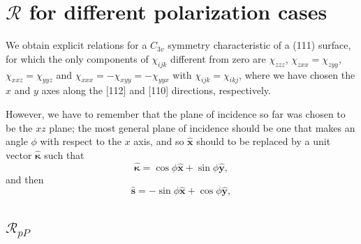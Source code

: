 \documentclass[10pt]{article}
\begin{document}
\section{\texorpdfstring{$\mathcal{R}$}{R} for different polarization cases}

We obtain explicit relations for a $C_{3v}$ symmetry characteristic of a (111)
surface, for which the only components of $\chi_{ijk}$ different from zero are
$\chi_{zzz}$, $\chi_{zxx}=\chi_{zyy}$, $\chi_{xxz}=\chi_{yyz}$ and
$\chi_{xxx}=-\chi_{xyy}=-\chi_{yyx}$ with $\chi_{ijk}=\chi_{ikj}$, where we
have chosen the $x$ and $y$ axes along the [112] and [110] directions,
respectively.

However, we have to remember that the plane of incidence so far was chosen to
be the $xz$ plane; the most general plane of incidence should be one that makes
an angle $\phi$ with respect to the $x$ axis, and so $\hat{\mathbf{x}}$ should
to be replaced by a unit vector $\hat{\mathbf{\kappa}}$ such that
\begin{equation}\label{mc1}
\hat{\boldsymbol{\kappa}}
= \cos\phi\hat{\mathbf{x}} + \sin\phi\hat{\mathbf{y}},
\end{equation}
and then
\begin{equation}\label{mc2}
\hat{\mathbf{s}} = -\sin\phi\hat{\mathbf{x}} + \cos\phi\hat{\mathbf{y}},
\end{equation}

\subsection{\texorpdfstring{$\mathcal{R}_{pP}$}{RpP}}
\end{document}
